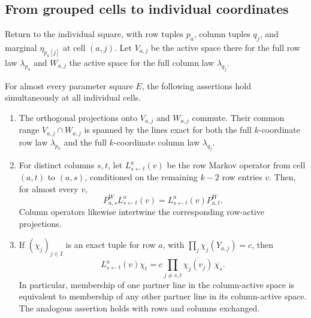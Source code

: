 \subsection{From grouped cells to individual coordinates}

Return to the individual square, with row tuples $p_a$, column tuples
$q_j$, and marginal $\eta_{p_a[j]}$ at cell $(a,j)$.  Let $V_{a,j}$ be
the active space there for the full row law $\lambda_{p_a}$ and
$W_{a,j}$ the active space for the full column law $\lambda_{q_j}$.

\begin{proposition}\label{prop:common-exact-lines}
For almost every parameter square $E$, the following assertions hold
simultaneously at all individual cells.
\begin{enumerate}
\item The orthogonal projections onto $V_{a,j}$ and $W_{a,j}$ commute.
Their common range $V_{a,j}\cap W_{a,j}$ is spanned by the lines exact
for both the full $k$-coordinate row law $\lambda_{p_a}$ and the full
$k$-coordinate column law $\lambda_{q_j}$.
\item For distinct columns $s,t$, let $L^a_{s\leftarrow t}(v)$ be the
row Markov operator from cell $(a,t)$ to $(a,s)$, conditioned on the
remaining $k-2$ row entries $v$.  Then, for almost every $v$,
\[
 P^W_{a,s}L^a_{s\leftarrow t}(v)
 =L^a_{s\leftarrow t}(v)P^W_{a,t}.
\]
Column operators likewise intertwine the corresponding row-active
projections.
\item If $(\chi_j)_{j\in I}$ is an exact tuple for row $a$, with
$\prod_j\chi_j(Y_{a,j})=c$, then
\begin{equation}\label{eq:exact-partner-transport}
 L^a_{s\leftarrow t}(v)\chi_t
 =c\!\prod_{j\ne s,t}\overline{\chi_j(v_j)}\,
   \overline{\chi_s}.
\end{equation}
In particular, membership of one partner line in the column-active
space is equivalent to membership of any other partner line in its
column-active space.  The analogous assertion holds with rows and
columns exchanged.
\end{enumerate}
\end{proposition}

